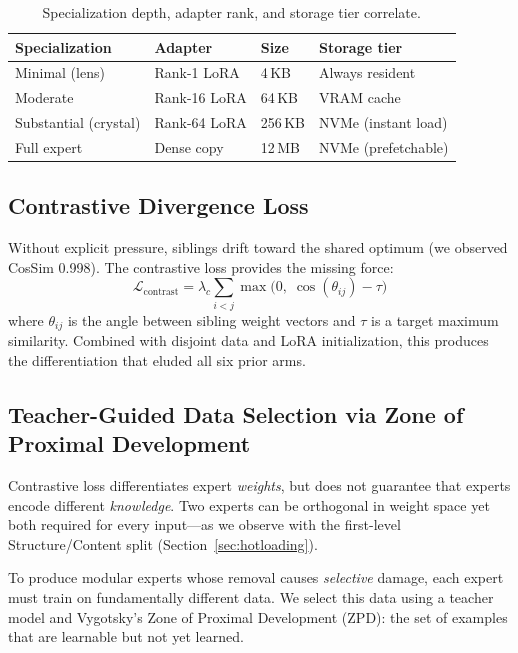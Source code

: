 \documentclass{article}
\begin{document}
\begin{table}[t]
\centering
\caption{Specialization depth, adapter rank, and storage tier correlate.}
\label{tab:unification}
\begin{tabular}{@{}llll@{}}
\toprule
Specialization & Adapter & Size & Storage tier \\
\midrule
Minimal (lens) & Rank-1 LoRA & 4\,KB & Always resident \\
Moderate       & Rank-16 LoRA & 64\,KB & VRAM cache \\
Substantial (crystal) & Rank-64 LoRA & 256\,KB & NVMe (instant load) \\
Full expert    & Dense copy & 12\,MB & NVMe (prefetchable) \\
\bottomrule
\end{tabular}
\end{table}

\subsection{Contrastive Divergence Loss}
\label{sec:contrastive}

Without explicit pressure, siblings drift toward the shared optimum (we observed
CosSim 0.998). The contrastive loss provides the missing force:
\begin{equation}
\mathcal{L}_{\text{contrast}} = \lambda_c \sum_{i < j} \max\bigl(0,\; \cos(\theta_{ij}) - \tau\bigr)
\label{eq:contrastive}
\end{equation}
where $\theta_{ij}$ is the angle between sibling weight vectors and $\tau$ is a
target maximum similarity. Combined with disjoint data and LoRA initialization,
this produces the differentiation that eluded all six prior arms.

\subsection{Teacher-Guided Data Selection via Zone of Proximal Development}
\label{sec:zpd}

Contrastive loss differentiates expert \emph{weights}, but does not guarantee
that experts encode different \emph{knowledge}. Two experts can be orthogonal
in weight space yet both required for every input---as we observe with the
first-level Structure/Content split (Section~\ref{sec:hotloading}).

To produce modular experts whose removal causes \emph{selective} damage, each
expert must train on fundamentally different data. We select this data using a
teacher model and Vygotsky's Zone of Proximal Development (ZPD): the set of
examples that are learnable but not yet learned.
\end{document}
